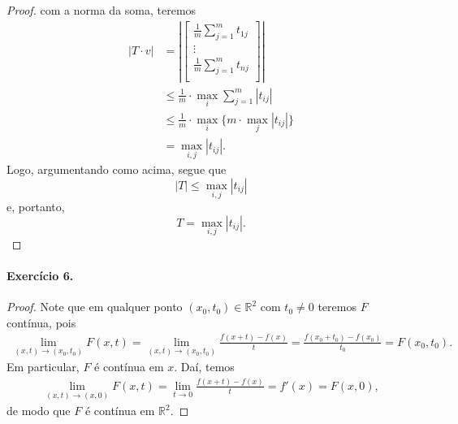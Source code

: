\documentclass[12pt,a4paper]{article}
\newcommand{\R}{\mathbb{R}}
\begin{document}
\begin{proof}
        com a norma da soma, teremos
        \begin{align*}
            |T \cdot v|
            &= \left|\begin{bmatrix}
                \displaystyle{\frac{1}{m}\sum_{j=1}^m t_{1j}} \\
                \vdots \\
                \displaystyle{\frac{1}{m}\sum_{j=1}^m t_{nj}} \\
            \end{bmatrix}\right| \\
            &\leq \frac{1}{m}\cdot\max_i \displaystyle{\sum_{j=1}^m |t_{ij}|} \\
            &\leq \frac{1}{m}\cdot\max_i \{m\cdot\max_j |t_{ij}|\} \\
            &= \max_{i,j} |t_{ij}|.
        \end{align*}
        Logo, argumentando como acima, segue que
        \begin{equation*}
            |T| \leq \max_{i,j} |t_{ij}|
        \end{equation*}
        e, portanto,
        \begin{equation*}
            T = \max_{i,j} |t_{ij}|.
        \end{equation*}
    \end{proof}
\paragraph{Exercício 6.}
    \begin{proof}
        Note que em qualquer ponto $(x_0, t_0)\in\R^2$ com $t_0\neq 0$ teremos
        $F$ contínua, pois
        \begin{align*}
            \lim_{(x,t)\to (x_0,t_0)} F(x,t)
            = \lim_{(x,t)\to (x_0,t_0)} \frac{f(x+t) - f(x)}{t}
            = \frac{f(x_0+t_0) - f(x_0)}{t_0}
            = F(x_0, t_0).
        \end{align*}
        Em particular, $F$ é contínua em $x$. Daí, temos
        \begin{align*}
            \lim_{(x,t) \to (x, 0)} F(x,t)
            = \lim_{t\to 0} \frac{f(x+t) - f(x)}{t}
            = f'(x)
            = F(x,0),
        \end{align*}
        de modo que $F$ é contínua em $\R^2$.
    \end{proof}
\end{document}
